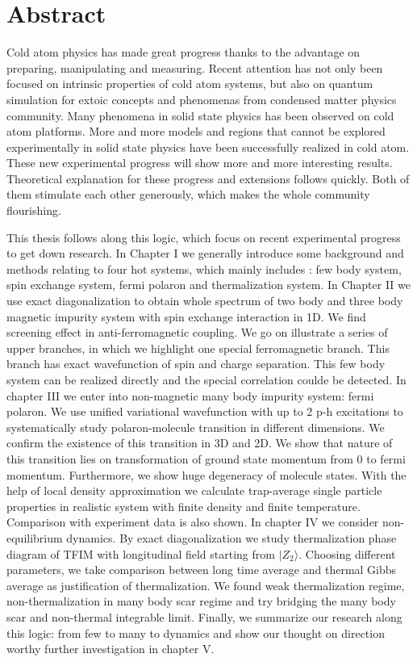 \intobmk\chapter*{Abstract}%

Cold atom physics has made great progress thanks to the advantage on preparing, manipulating and measuring. Recent attention has not only been focused on intrinsic properties of cold atom systems, but also on quantum simulation for extoic concepts and phenomenas from condensed matter physics community. Many phenomena in solid state physics has been observed on cold atom platforms. More and more models and regions that cannot be explored experimentally in solid state physics have been successfully realized in cold atom. These new experimental progress will show more and more interesting results. Theoretical explanation for these progress and extensions follows quickly. Both of them stimulate each other generously, which makes the whole community flourishing.

This thesis follows along this logic, which focus on recent experimental progress to get down research. In Chapter I we generally introduce some background and methods relating to four hot systems, which mainly includes : few body system, spin exchange system, fermi polaron and thermalization system. In Chapter II we use exact diagonalization to obtain whole spectrum of two body and three body magnetic impurity system with spin exchange interaction in 1D. We find screening effect in anti-ferromagnetic coupling. We go on illustrate a series of upper branches, in which we highlight one special ferromagnetic branch. This branch has exact wavefunction of spin and charge separation. This few body system can be realized directly and the special correlation coulde be detected. In chapter III we enter into non-magnetic many body impurity system: fermi polaron. We use unified variational wavefunction with up to 2 p-h excitations to systematically study polaron-molecule transition in different dimensions. We confirm the existence of this transition in 3D and 2D. We show that nature of this transition lies on transformation of ground state momentum from 0 to fermi momentum. Furthermore, we show huge degeneracy of molecule states. With the help of local density approximation we calculate trap-average single particle properties in realistic system with finite density and finite temperature. Comparison with experiment data is also shown. In chapter IV we consider non-equilibrium dynamics. By exact diagonalization we study thermalization phase diagram of TFIM with longitudinal field starting from $|Z_2\rangle$. Choosing different parameters, we take comparison between long time average and thermal Gibbs average as justification of thermalization. We found weak thermalization regime, non-thermalization in many body scar regime and try bridging the many body scar and non-thermal integrable limit. Finally, we summarize our research along this logic: from few to many to dynamics and show our thought on direction worthy further investigation in chapter V.

